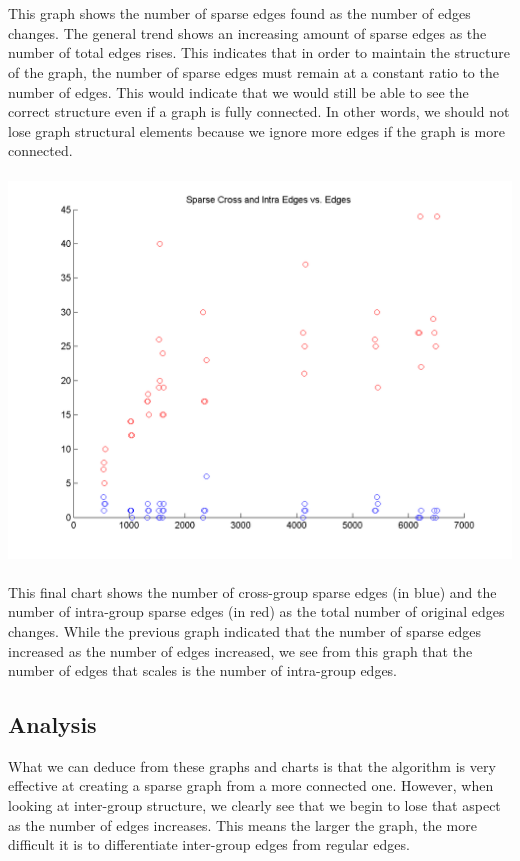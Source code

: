 \documentclass{article}
\begin{document}
\\\\
This graph shows the number of sparse edges found as the number of edges changes. The general trend shows an increasing amount of sparse edges as the number of total edges rises. This indicates that in order to maintain the structure of the graph, the number of sparse edges must remain at a constant ratio to the number of edges. This would indicate that we would still be able to see the correct structure even if a graph is fully connected. In other words, we should not lose graph structural elements because we ignore more edges if the graph is more connected.
\\\\
\includegraphics[scale=0.5]{imgs/charts/sparse_cross_intra_edges_vs_edges.png}
\\\\
This final chart shows the number of cross-group sparse edges (in blue) and the number of intra-group sparse edges (in red) as the total number of original edges changes. While the previous graph indicated that the number of sparse edges increased as the number of edges increased, we see from this graph that the number of edges that scales is the number of intra-group edges.

\subsection{Analysis}
What we can deduce from these graphs and charts is that the algorithm is very effective at creating a sparse graph from a more connected one. However, when looking at inter-group structure, we clearly see that we begin to lose that aspect as the number of edges increases. This means the larger the graph, the more difficult it is to differentiate inter-group edges from regular edges. 
\end{document}
